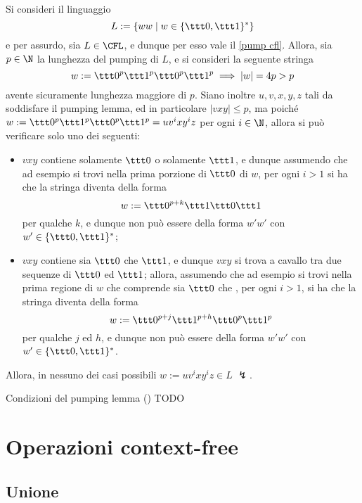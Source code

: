 \documentclass[a4paper, 12pt]{report}
\begin{document}
    \begin{example}
        \label{pump cfl ex2}
        Si consideri il linguaggio $$L := \{ww \mid w \in \{\ttt 0, \ttt 1\}^*\}$$ e per assurdo, sia $L \in \mathrm{\CFL}$, e dunque per esso vale il \cref{pump cfl}. Allora, sia $p \in \N$ la lunghezza del pumping di $L$, e si consideri la seguente stringa $$w := \ttt 0 ^p \ttt 1 ^p \ttt 0 ^p \ttt 1 ^p \implies |w| = 4p > p$$ avente sicuramente lunghezza maggiore di $p$. Siano inoltre $u, v, x, y, z$ tali da soddisfare il pumping lemma, ed in particolare $|vxy| \le p$, ma poiché $w := \ttt 0^p \ttt 1^p \ttt 0^p \ttt 1^p = uv^ixy^iz$ per ogni $i \in \N$, allora si può verificare solo uno dei seguenti:

        \begin{itemize}
            \item $vxy$ contiene solamente $\ttt 0$ o solamente $\ttt 1$, e dunque assumendo che ad esempio si trovi nella prima porzione di $\ttt 0$ di $w$, per ogni $i > 1$ si ha che la stringa diventa della forma $$w := \ttt 0 ^{p + k} \ttt 1 \ttt 0 \ttt 1$$ per qualche $k$, e dunque non può essere della forma $w'w'$ con $w' \in \{\ttt 0, \ttt1\}^*$;
            \item $vxy$ contiene sia $\ttt 0$ che $\ttt 1$, e dunque $vxy$ si trova a cavallo tra due sequenze di $\ttt 0$ ed $\ttt 1$; allora, assumendo che ad esempio si trovi nella prima regione di $w$ che comprende sia $\ttt 0$ che , per ogni $i > 1$, si ha che la stringa diventa della forma $$w := \ttt 0 ^{p + j} \ttt 1 ^{p + h} \ttt 0 ^p \ttt 1 ^ p$$ per qualche $j$ ed $h$, e dunque non può essere della forma $w'w'$ con $w' \in \{\ttt 0, \ttt 1\}^*$.
        \end{itemize}
        
        Allora, in nessuno dei casi possibili $w := u v^i x y^i z \in L$ $\lightning$.
    \end{example}

    \begin{framedobs}{Condizioni del pumping lemma (\CFL)}
        TODO
    \end{framedobs}

    \section{Operazioni context-free}

    \subsection{Unione}
\end{document}
